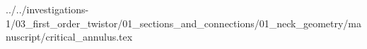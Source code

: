 ../../investigations-1/03_first_order_twistor/01_sections_and_connections/01_neck_geometry/manuscript/critical_annulus.tex